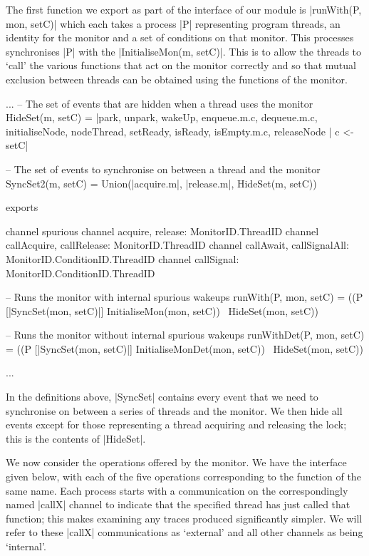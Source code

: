 The first function we export as part of the interface of our module is |runWith(P, mon, setC)| which each takes a process |P| representing program threads, an identity for the monitor and a set of conditions on that monitor. This processes synchronises |P| with the |InitialiseMon(m, setC)|. This is to allow the threads to `call' the various functions that act on the monitor correctly and so that mutual exclusion between threads can be obtained using the functions of the monitor. 

\begin{cspm}
  ...
  -- The set of events that are hidden when a thread uses the monitor
  HideSet(m, setC) = 
    {|park, unpark, wakeUp, enqueue.m.c, dequeue.m.c, initialiseNode, nodeThread,
      setReady, isReady, isEmpty.m.c, releaseNode | c <- setC|}

  -- The set of events to synchronise on between a thread and the monitor
    SyncSet2(m, setC) = Union({{|acquire.m|}, {|release.m|}, HideSet(m, setC)})

exports

  channel spurious
  channel acquire, release: MonitorID.ThreadID
  channel callAcquire, callRelease: MonitorID.ThreadID
  channel callAwait, callSignalAll: MonitorID.ConditionID.ThreadID
  channel callSignal: MonitorID.ConditionID.ThreadID

  -- Runs the monitor with internal spurious wakeups
  runWith(P, mon, setC) = 
    ((P [|SyncSet(mon, setC)|] 
          InitialiseMon(mon, setC)) \ HideSet(mon, setC))

  -- Runs the monitor without internal spurious wakeups
  runWithDet(P, mon, setC) = 
    ((P [|SyncSet(mon, setC)|] 
          InitialiseMonDet(mon, setC)) \  HideSet(mon, setC))

  ...
\end{cspm}

In the definitions above, |SyncSet| contains every event that we need to synchronise on between a series of threads and the monitor. We then hide all events except for those representing a thread acquiring and releasing the lock; this is the contents of |HideSet|.

We now consider the operations offered by the monitor. We have the interface given below, with each of the five operations corresponding to the function of the same name. Each process starts with a communication on the correspondingly named |callX| channel to indicate that the specified thread has just called that function; this makes examining any traces produced significantly simpler. We will refer to these |callX| communications as `external' and all other channels as being `internal'. 
  
